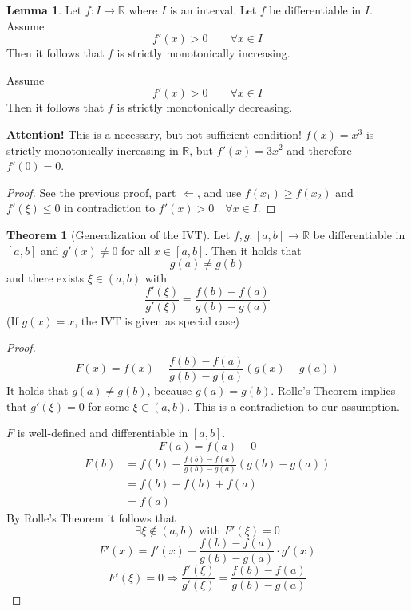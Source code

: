 \documentclass[a4paper,landscape,twocolumn]{article}
\theoremstyle{definition}
\newtheorem{theorem}{Theorem}
\newtheorem{lemma}{Lemma}
\begin{document}
%
\begin{lemma}
  Let $f: I \to \mathbb R$ where $I$ is an interval.
  Let $f$ be differentiable in $I$. Assume
  \[ f'(x) > 0 \qquad \forall x \in I \]
  Then it follows that $f$ is strictly monotonically increasing.

  Assume
  \[ f'(x) > 0 \qquad \forall x \in I \]
  Then it follows that $f$ is strictly monotonically decreasing.

  \textbf{Attention!} This is a necessary, but not sufficient condition!
  $f(x) = x^3$ is strictly monotonically increasing in $\mathbb R$, but
  $f'(x) = 3x^2$ and therefore $f'(0) = 0$.
\end{lemma}
\begin{proof}
  See the previous proof, part $\Leftarrow$, and use $f(x_1) \geq f(x_2)$
  and $f'(\xi) \leq 0$ in contradiction to $f'(x) > 0 \quad \forall x \in I$.
\end{proof}
%
\begin{theorem}[Generalization of the IVT]
  Let $f, g: [a,b] \to \mathbb R$ be differentiable in $[a,b]$ and $g'(x) \neq 0$
  for all $x \in [a,b]$. Then it holds that
  \[ g(a) \neq g(b) \]
  and there exists $\xi \in (a,b)$ with
  \[ \frac{f'(\xi)}{g'(\xi)} = \frac{f(b) - f(a)}{g(b) - g(a)} \]
  (If $g(x) = x$, the IVT is given as special case)
\end{theorem}
%
\begin{proof}
  \[ F(x) = f(x) - \frac{f(b) - f(a)}{g(b) - g(a)} (g(x) - g(a)) \]
  It holds that $g(a) \neq g(b)$, because $g(a) = g(b)$.
  Rolle's Theorem implies that $g'(\xi) = 0$ for some $\xi \in (a,b)$.
  This is a contradiction to our assumption.

  $F$ is well-defined and differentiable in $[a,b]$.
  \[ F(a) = f(a) - 0 \]
  \begin{align*}
    F(b) &= f(b) - \frac{f(b) - f(a)}{g(b) - g(a)} (g(b) - g(a)) \\
         &= f(b) - f(b) + f(a) \\
         &= f(a)
  \end{align*}
  By Rolle's Theorem it follows that
  \[ \exists \xi \not\in (a, b) \text{ with } F'(\xi) = 0 \]
  \[ F'(x) = f'(x) - \frac{f(b) - f(a)}{g(b) - g(a)} \cdot g'(x) \]
  \[ F'(\xi) = 0 \Rightarrow \frac{f'(\xi)}{g'(\xi)} = \frac{f(b) - f(a)}{g(b) - g(a)} \]
\end{proof}
%
\end{document}
